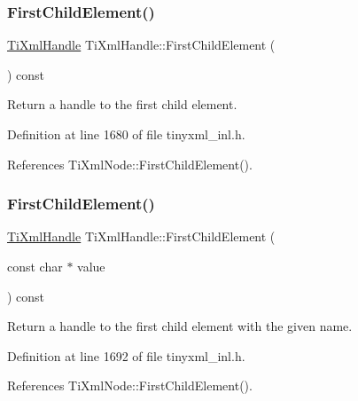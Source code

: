 \subsubsection{\texorpdfstring{First\+Child\+Element()}{FirstChildElement()}\hspace{0.1cm}{\footnotesize\ttfamily [1/3]}}
{\footnotesize\ttfamily \hyperlink{class_ti_xml_handle}{Ti\+Xml\+Handle} Ti\+Xml\+Handle\+::\+First\+Child\+Element (\begin{DoxyParamCaption}{ }\end{DoxyParamCaption}) const}



Return a handle to the first child element. 



Definition at line 1680 of file tinyxml\+\_\+inl.\+h.



References Ti\+Xml\+Node\+::\+First\+Child\+Element().

\hypertarget{class_ti_xml_handle_a3eaf2d2d4c087cd8a48da261042e75bc}{}\label{class_ti_xml_handle_a3eaf2d2d4c087cd8a48da261042e75bc} 
\subsubsection{\texorpdfstring{First\+Child\+Element()}{FirstChildElement()}\hspace{0.1cm}{\footnotesize\ttfamily [2/3]}}
{\footnotesize\ttfamily \hyperlink{class_ti_xml_handle}{Ti\+Xml\+Handle} Ti\+Xml\+Handle\+::\+First\+Child\+Element (\begin{DoxyParamCaption}\item[{const char $\ast$}]{value }\end{DoxyParamCaption}) const}



Return a handle to the first child element with the given name. 



Definition at line 1692 of file tinyxml\+\_\+inl.\+h.



References Ti\+Xml\+Node\+::\+First\+Child\+Element().

\hypertarget{class_ti_xml_handle_ad048deff008dbb4b6887e9ac0d91f7df}{}\label{class_ti_xml_handle_ad048deff008dbb4b6887e9ac0d91f7df} 
